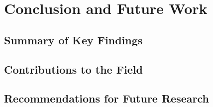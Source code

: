\chapter{Conclusion and Future Work}

\section{Summary of Key Findings}

\section{Contributions to the Field}

\section{Recommendations for Future Research}